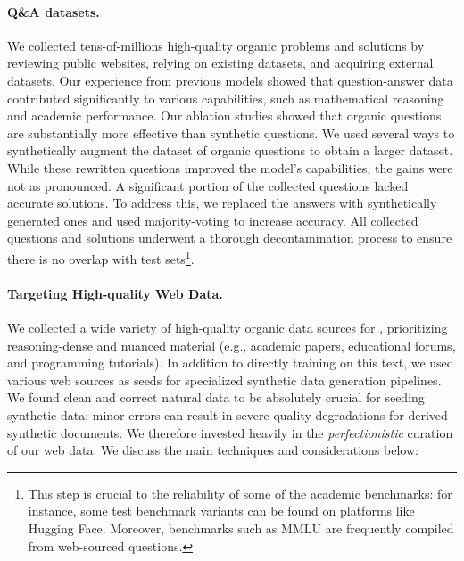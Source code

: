 \paragraph{Q\&A datasets.}
We collected tens-of-millions high-quality organic problems and solutions by reviewing public websites, relying on existing datasets, and acquiring external datasets. Our experience from previous models showed that question-answer data contributed significantly to various capabilities, such as mathematical reasoning and academic performance. Our ablation studies showed that organic questions are substantially more effective than synthetic questions. We used several ways to synthetically augment the dataset of organic questions to obtain a larger dataset. While these rewritten questions improved the model’s capabilities, the gains were not as pronounced.
A significant portion of the collected questions lacked accurate solutions. To address this, we replaced the answers with synthetically generated ones and used majority-voting to increase accuracy.
All collected questions and solutions underwent a thorough decontamination process to ensure there is no overlap with test sets\footnote{This step is crucial to the reliability of some of the academic benchmarks: for instance, some test benchmark variants can be found on platforms like Hugging Face. Moreover, benchmarks such as MMLU are frequently compiled from web-sourced questions.}.

\paragraph{Targeting High-quality Web Data.}\label{sec:web_data}
We collected a wide variety of high-quality organic data sources for \modelwithoutspace, prioritizing reasoning-dense and nuanced material (e.g., academic papers, educational forums, and programming tutorials). In addition to directly training on this text, we used various web sources as seeds for specialized synthetic data generation pipelines. We found clean and correct natural data to be absolutely crucial for seeding synthetic data: minor errors can result in severe quality degradations for derived synthetic documents. We therefore invested heavily in the \textit{perfectionistic} curation of our web data. We discuss the main techniques and considerations below:

